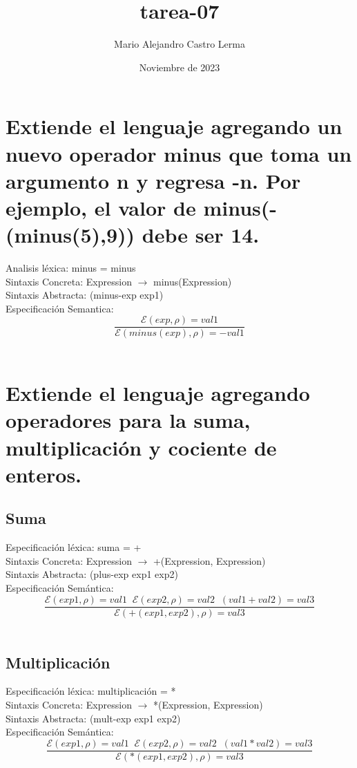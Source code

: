 \documentclass{article}
\title{tarea-07}
\author{Mario Alejandro Castro Lerma}
\date{Noviembre de 2023}
\begin{document}
\maketitle

\section{Extiende el lenguaje agregando un nuevo operador minus que toma un argumento n y regresa -n. Por ejemplo, el valor de minus(-(minus(5),9)) debe ser 14.}
Analisis léxica:
minus = minus
\\
Sintaxis Concreta:
Expression $\rightarrow$ minus(Expression)
\\
Sintaxis Abstracta:
(minus-exp exp1)
\\
Especificación Semantica:
$$\frac{\mathcal{E} (exp, \rho) = val1}{\mathcal{E} (minus(exp), \rho ) = -val1}$$
\\


\section{Extiende el lenguaje agregando operadores para la suma, multiplicación y 
cociente de enteros.}
\subsection{Suma}
Especificación léxica:
suma = +
\\
Sintaxis Concreta:
Expression $\rightarrow$ +(Expression, Expression)
\\
Sintaxis Abstracta:
(plus-exp exp1 exp2)
\\
Especificación Semántica:
$$\frac{\mathcal{E}(exp1, \rho) = val1 \;\; \mathcal{E}(exp2, \rho) = val2 \;\; (val1 + val2) = val3}{\mathcal{E} (+(exp1, exp2), \rho ) = val3}$$
\\

\subsection{Multiplicación}
Especificación léxica:
multiplicación = *
\\
Sintaxis Concreta:
Expression $\rightarrow$ *(Expression, Expression)
\\
Sintaxis Abstracta:
(mult-exp exp1 exp2)
\\
Especificación Semántica:
$$\frac{\mathcal{E}(exp1, \rho) = val1 \;\; \mathcal{E}(exp2, \rho) = val2 \;\; (val1 * val2) = val3}{\mathcal{E} (*(exp1, exp2), \rho ) = val3}$$
\\
\end{document}
